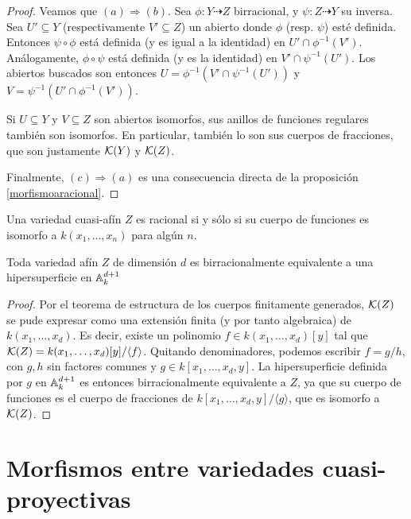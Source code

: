 \documentclass[ACGA.tex]{subfiles}
\begin{document}
\begin{proof}
 Veamos que $(a)\Rightarrow(b)$. Sea $\phi:Y\dashrightarrow Z$ birracional, y $\psi:Z\dashrightarrow Y$ su inversa. Sea $U'\subseteq Y$ (respectivamente $V'\subseteq Z$) un abierto donde $\phi$ (resp. $\psi$) esté definida. Entonces $\psi\circ\phi$ está definida (y es igual a la identidad) en $U'\cap \phi^{-1}(V')$. Análogamente, $\phi\circ\psi$ está definida (y es la identidad) en $V'\cap\psi^{-1}(U')$. Los abiertos buscados son entonces $U=\phi^{-1}(V'\cap\psi^{-1}(U'))$ y $V=\psi^{-1}(U'\cap \phi^{-1}(V'))$.

Si $U\subseteq Y$ y $V\subseteq Z$ son abiertos isomorfos, sus anillos de funciones regulares también son isomorfos. En particular, también lo son sus cuerpos de fracciones, que son justamente ${\mathcal K}(Y)$ y ${\mathcal K}(Z)$. 

Finalmente, $(c)\Rightarrow(a)$ es una consecuencia directa de la proposición \ref{morfismoaracional}.
\end{proof}

\begin{coro}
 Una variedad cuasi-afín $Z$ es racional si y sólo si su cuerpo de funciones es isomorfo a $k(x_1,\ldots,x_n)$ para algún $n$.
\end{coro}

\begin{coro}\label{behipersuperficie}
 Toda variedad afín $Z$ de dimensión $d$ es birracionalmente equivalente a una hipersuperficie en $\mathbb{A}^{d+1}_k$
\end{coro}

\begin{proof} Por el teorema de estructura de los cuerpos finitamente generados, ${\mathcal K}(Z)$ se pude expresar como una extensión finita (y por tanto algebraica) de $k(x_1,\ldots,x_d)$. Es decir, existe un polinomio $f\in k(x_1,\ldots,x_d)[y]$ tal que ${\mathcal K}(Z)=k(x_1,\ldots,x_d)[y]/\langle f\rangle$. Quitando denominadores, podemos escribir $f=g/h$, con $g,h$ sin factores comunes y $g\in k[x_1,\ldots,x_d,y]$. La hipersuperficie definida por $g$ en $\mathbb{A}^{d+1}_k$ es entonces birracionalmente equivalente a $Z$, ya que su cuerpo de funciones es el cuerpo de fracciones de $k[x_1,\ldots,x_d,y]/\langle g\rangle$, que es isomorfo a ${\mathcal K}(Z)$.
\end{proof}





 




\section{Morfismos entre variedades cuasi-proyectivas}
\end{document}
